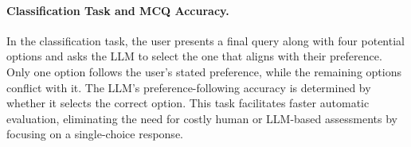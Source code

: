 {\renewcommand{\arraystretch}{1.2}
\begin{table}[h]
\centering
\caption{Error type aggregation rules: Evaluators perform binary checks for each metric listed in the column headers. The results are then aggregated according to the table rules to classify the error into one of the four defined types.} 
\label{tab:error_types}




\end{table}

\paragraph{Classification Task and MCQ Accuracy.}
\label{sec:method_classification}
In the classification task, the user presents a final query along with four potential options and asks the LLM to select the one that aligns with their preference. Only one option follows the user’s stated preference, while the remaining options conflict with it. The LLM’s preference-following accuracy is determined by whether it selects the correct option. This task facilitates faster automatic evaluation, eliminating the need for costly human or LLM-based assessments by focusing on a single-choice response.



}
